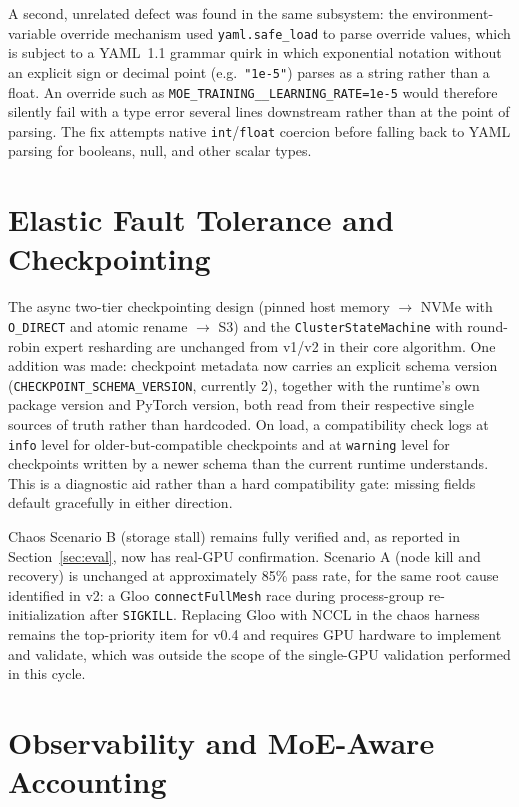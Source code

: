\documentclass[11pt]{article}
\begin{document}
A second, unrelated defect was found in the same subsystem: the
environment-variable override mechanism used \texttt{yaml.safe\_load} to
parse override values, which is subject to a YAML~1.1 grammar quirk in
which exponential notation without an explicit sign or decimal point
(e.g.\ \texttt{"1e-5"}) parses as a string rather than a float. An override
such as \texttt{MOE\_TRAINING\_\_LEARNING\_RATE=1e-5} would therefore
silently fail with a type error several lines downstream rather than at
the point of parsing. The fix attempts native \texttt{int}/\texttt{float}
coercion before falling back to YAML parsing for booleans, null, and other
scalar types.

\section{Elastic Fault Tolerance and Checkpointing}

The async two-tier checkpointing design (pinned host memory $\rightarrow$
NVMe with \texttt{O\_DIRECT} and atomic rename $\rightarrow$ S3) and the
\texttt{ClusterStateMachine} with round-robin expert resharding are
unchanged from v1/v2 in their core algorithm. One addition was made:
checkpoint metadata now carries an explicit schema version
(\texttt{CHECKPOINT\_SCHEMA\_VERSION}, currently 2), together with the
runtime's own package version and PyTorch version, both read from their
respective single sources of truth rather than hardcoded. On load, a
compatibility check logs at \texttt{info} level for older-but-compatible
checkpoints and at \texttt{warning} level for checkpoints written by a
newer schema than the current runtime understands. This is a diagnostic
aid rather than a hard compatibility gate: missing fields default
gracefully in either direction.

Chaos Scenario B (storage stall) remains fully verified and, as reported
in Section~\ref{sec:eval}, now has real-GPU confirmation. Scenario A (node
kill and recovery) is unchanged at approximately 85\% pass rate, for the
same root cause identified in v2: a Gloo \texttt{connectFullMesh} race
during process-group re-initialization after \texttt{SIGKILL}. Replacing
Gloo with NCCL in the chaos harness remains the top-priority item for v0.4
and requires GPU hardware to implement and validate, which was outside the
scope of the single-GPU validation performed in this cycle.

\section{Observability and MoE-Aware Accounting}
\end{document}

